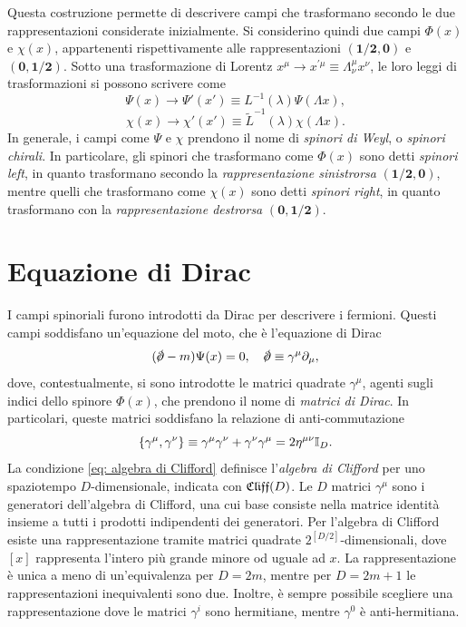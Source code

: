Questa costruzione permette di descrivere campi che trasformano secondo le due rappresentazioni considerate inizialmente. Si considerino quindi due campi $\Phi(x)$ e $\chi(x)$, appartenenti rispettivamente alle rappresentazioni $\bm{(1/2,0)}$ e $\bm{(0,1/2)}$. Sotto una trasformazione di Lorentz $x^\mu \to x^{\prime\mu} \equiv \Lambda^\mu_\nu x^\nu$, le loro leggi di trasformazioni si possono scrivere come 
\begin{equation}
    \Psi(x) \to \Psi'(x') \equiv L^{-1}(\lambda)\Psi(\Lambda x),
\end{equation}
\begin{equation}
    \chi(x) \to \chi'(x') \equiv \tilde{L}^{-1}(\lambda)\chi(\Lambda x).
\end{equation}
In generale, i campi come $\Psi$ e $\chi$ prendono il nome di \emph{spinori di Weyl}, o \emph{spinori chirali}. In particolare, gli spinori che trasformano come $\Phi(x)$ sono detti \emph{spinori left}, in quanto trasformano secondo la \emph{rappresentazione sinistrorsa} $\bm{(1/2,0)}$, mentre quelli che trasformano come $\chi(x)$ sono detti \emph{spinori right}, in quanto trasformano con la \emph{rappresentazione destrorsa} $\bm{(0,1/2)}$.

\section{Equazione di Dirac}
I campi spinoriali furono introdotti da Dirac per descrivere i fermioni. Questi campi soddisfano un'equazione del moto, che è l'equazione di Dirac
\begin{equation}
\label{eq: equazione di Dirac}
    (\sl{\p} - m)\Psi(x) = 0,\quad \sl{\p} \equiv \gamma^\mu\p_\mu,
\end{equation}
dove, contestualmente, si sono introdotte le matrici quadrate $\gamma^\mu$, agenti sugli indici dello spinore $\Phi(x)$, che prendono il nome di \emph{matrici di Dirac}. In particolari, queste matrici soddisfano la relazione di anti-commutazione 
\begin{equation}
\label{eq: algebra di Clifford}
    \{\gamma^\mu,\gamma^\nu\} \equiv \gamma^\mu\gamma^\nu + \gamma^\nu\gamma^\mu = 2\eta^{\mu\nu}\mathbb{I}_D.
\end{equation}
La condizione \eqref{eq: algebra di Clifford} definisce l'\emph{algebra di Clifford} per uno spaziotempo $D$-dimensionale, indicata con $\mathfrak{Cliff}(D)$. Le $D$ matrici $\gamma^\mu$ sono i generatori dell'algebra di Clifford, una cui base consiste nella matrice identità insieme a tutti i prodotti indipendenti dei generatori. Per l'algebra di Clifford esiste una rappresentazione tramite matrici quadrate $2^{[D/2]}$-dimensionali, dove $[x]$ rappresenta l'intero più grande minore od uguale ad $x$. La rappresentazione è unica a meno di un'equivalenza per $D = 2m$, mentre per $D = 2m + 1$ le rappresentazioni inequivalenti sono due. Inoltre, è sempre possibile scegliere una rappresentazione dove le matrici $\gamma^i$ sono hermitiane, mentre $\gamma^0$ è anti-hermitiana. 



